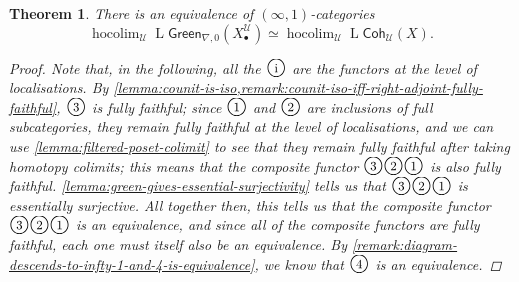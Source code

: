 \documentclass[11pt,fleqn]{article}
\theoremstyle{plain}
\newtheorem{theorem}{Theorem}[subsection]
\theoremstyle{definition}
\theoremstyle{remark}
\numberwithin{equation}{theorem}
\newcommand{\cover}{\mathcal{U}}
\newcommand{\gcohUX}{\mathsf{Coh}_{\cover}(X)}
\newcommand{\greenzeroX}{\mathsf{Green}_{\nabla,0}(X_\bullet^\cover)}
\newcommand{\numberincircle}[1]{\text{\Large\textcircled{\small #1}}}
\DeclareMathOperator{\LL}{L}
\DeclareMathOperator{\hocolim}{hocolim}
\begin{document}
        \begin{theorem}\label{theorem:the-main-coherent-theorem}
            There is an equivalence of $(\infty,1)$-categories
            \begin{equation*}
                \hocolim_\cover\LL{\greenzeroX} \simeq \hocolim_\cover\LL{\gcohUX}.
            \end{equation*}
            \begin{proof}
                \emph{Note that, in the following, all the $\numberincircle{i}$ are the functors at the level of localisations.}
                By \cref{lemma:counit-is-iso,remark:counit-iso-iff-right-adjoint-fully-faithful}, $\numberincircle{3}$ is fully faithful; since $\numberincircle{1}$ and $\numberincircle{2}$ are inclusions of full subcategories, they remain fully faithful at the level of localisations, and we can use \cref{lemma:filtered-poset-colimit} to see that they remain fully faithful after taking homotopy colimits; this means that the composite functor $\numberincircle{3}\numberincircle{2}\numberincircle{1}$ is also fully faithful.
                \cref{lemma:green-gives-essential-surjectivity} tells us that $\numberincircle{3}\numberincircle{2}\numberincircle{1}$ is essentially surjective.
                All together then, this tells us that the composite functor $\numberincircle{3}\numberincircle{2}\numberincircle{1}$ is an equivalence, and since all of the composite functors are fully faithful, each one must itself also be an equivalence.
                By \cref{remark:diagram-descends-to-infty-1-and-4-is-equivalence}, we know that $\numberincircle{4}$ is an equivalence.
            \end{proof}
        \end{theorem}
\end{document}
